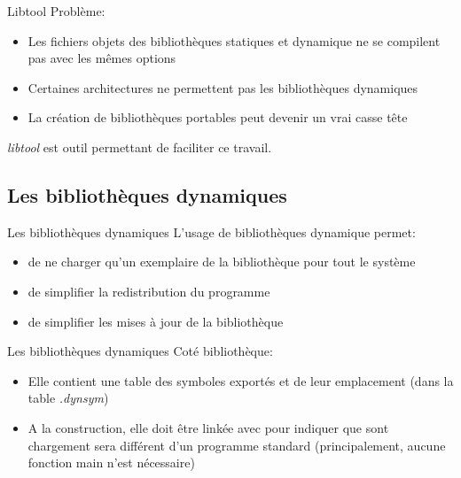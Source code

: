 \begin{frame}[fragile=singleslide]{Libtool}
  Problème:
  \begin{itemize}
  \item Les  fichiers objets des bibliothèques  statiques et dynamique
    ne se compilent pas avec les mêmes options
  \item  Certaines architectures ne  permettent pas  les bibliothèques
    dynamiques
  \item La  création de bibliothèques  portables peut devenir  un vrai
    casse tête
  \end{itemize}
  \emph{libtool} est outil permettant de faciliter ce travail.
\end{frame}

\subsection{Les bibliothèques dynamiques}

\begin{frame}[fragile=singleslide]{Les bibliothèques dynamiques}
  L'usage de bibliothèques dynamique permet:
  \begin{itemize}
  \item de ne charger qu'un exemplaire de la bibliothèque pour tout le
    système
  \item de simplifier la redistribution du programme
  \item de simplifier les mises à jour de la bibliothèque
  \end{itemize}
\end{frame}

\begin{frame}[fragile=singleslide]{Les bibliothèques dynamiques}
  Coté bibliothèque:
  \begin{itemize}
  \item  Elle contient  une table  des  symboles exportés  et de  leur
    emplacement (dans la table \emph{.dynsym})
  \item A  la construction, elle  doit être linkée  avec 
    pour indiquer  que sont  chargement sera différent  d'un programme
    standard (principalement, aucune fonction main n'est nécessaire)
  \end{itemize}
\end{frame}

